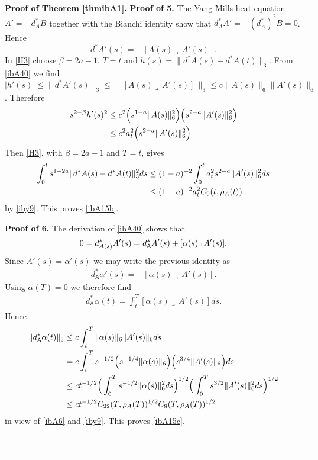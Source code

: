 \documentclass[12pt]{article}
\newenvironment{proof}[1][Proof]{\textbf{#1.} }{\ \rule{0.5em}{0.5em}}
\def \({\Big(}
\def \){\Big)}
\def \As{\mathsf{A}}
\def \beq{\begin{equation}}
\def \eeq{\end{equation}}
\def \eref{\eqref}
\def \lrc{\lrcorner\,}
\numberwithin{equation}{section}
\begin{document}
\begin{proof}[Proof of Theorem \ref{thmibA1}]
\bigskip
\noindent
{\bf Proof of 5.} 
The Yang-Mills heat equation  $A' = -d_A^* B$  together with the Bianchi identity show that 
 $d_A^* A'  = -(d_A^*)^2 B = 0$. Hence  
 \beq
 d^*A'(s) = -[A(s)\lrc A'(s)].         \label{ibA40}
 \eeq  
 In \eref{H3} choose  $\beta = 2a -1$,  
 $T =t$ and $h(s) = \|d^*A(s) - d^*A(t)\|_3$.   
From \eref{ibA40} we find 
$|h'(s)| \le \| d^*A'(s)\|_3 \le \|\, [A(s)\lrc A'(s)] \, \|_3 \le c \|A(s)\|_6 \|A'(s)\|_6$. 
Therefore
\begin{align}
s^{2-\beta} h'(s)^2 &\le c^2 \(s^{1-a}\|A(s)\|_6^2 \) \( s^{2-a} \|A'(s)\|_6^2\)  \notag\\
&\le c^2 a_t^2 \( s^{2-a} \|A'(s)\|_6^2\) \notag
\end{align}
Then \eref{H3},  with $\beta =2a -1$ and $T = t$, gives
\begin{align}
\int_0^t s^{1-2a}\|d^*A(s) - d^*A(t)\|_3^2 ds &\le (1-a)^{-2} \int_0^t a_t^2s^{2-a} \| A'(s)\|_6^2 ds \notag\\
&\le  (1-a)^{-2} a_t^2 C_9(t, \rho_A(t))  \notag
\end{align}
by \eref{iby9}.   This proves \eref{ibA15b}.    


\bigskip
\noindent
{\bf Proof of 6.} 
 The derivation of \eref{ibA40} shows that  
     \begin{align}
     0 = d_{A(s)}^* A'(s) = d_\As^* A'(s) + [\alpha(s)\lrc A'(s)].    \notag
     \end{align}
     Since $A'(s) = \alpha'(s)$ we may write the previous identity as
     \begin{align}
     d_\As^* \alpha'(s) = -  [\alpha(s)\lrc A'(s)].                \label{ibA69}
     \end{align}
     Using  $\alpha(T) =0$ we therefore find
     \begin{align}
     d_\As^* \alpha(t) = \int_t^T    [\alpha(s)\lrc A'(s)] ds.        \label{ibA70}
     \end{align}
     Hence
     \begin{align}
     \|d_\As^* \alpha(t)\|_3 &\le c\int_t^T \|\alpha(s)\|_6 \|A'(s)\|_6 ds \notag \\
     &=c \int_t^T s^{-1/2}\Big(s^{-1/4} \|\alpha(s)\|_6 \Big) \Big( s^{3/4}\|A'(s)\|_6\Big) ds \notag\\
     &\le c t^{-1/2} \Big(\int_0^T s^{-1/2} \|\alpha(s)\|_6^2 ds\Big)^{1/2} 
     \Big( \int_0^T s^{3/2}  \|A'(s)\|_6^2 ds\Big)^ {1/2} \notag \\
     &\le c t^{-1/2}     C_{22}(T, \rho_A(T))^{1/2} C_9(T, \rho_A(T))^{1/2}  
     \end{align}
     in view of \eref{ibA6} and \eref{iby9}.      This proves \eref{ibA15c}.
     



\end{proof}
\end{document}
